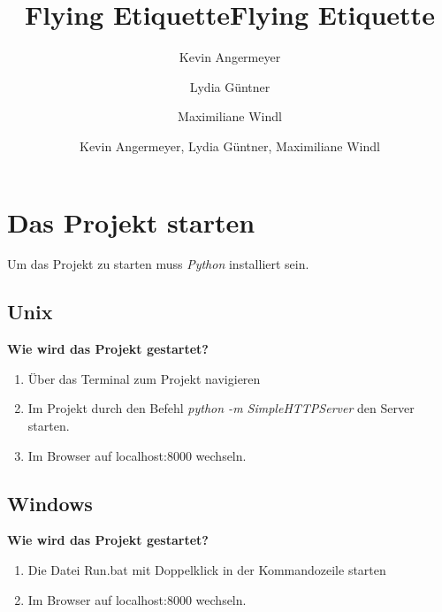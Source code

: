 \documentclass{mi-seminar}
\title{Flying Etiquette}
\author{Kevin Angermeyer \\ \and Lydia Güntner \\ \and Maximiliane Windl}
\title{Flying Etiquette}
\author{Kevin Angermeyer, Lydia Güntner, Maximiliane Windl}
\begin{document}
\maketitle
\vspace*{2.5cm}
\section{Das Projekt starten} \label{Das Projekt starten}
Um das Projekt zu starten muss \textit{Python} installiert sein.
\subsection{Unix}
\textbf{Wie wird das Projekt gestartet?}\newline
\begin{enumerate}
\item Über das Terminal zum Projekt navigieren
\item Im Projekt durch den Befehl \textit{python -m SimpleHTTPServer} den Server starten.\newline
\item Im Browser auf localhost:8000 wechseln.
\end{enumerate}
\subsection{Windows}
\textbf{Wie wird das Projekt gestartet?}\newline
\begin{enumerate}
\item Die Datei Run.bat mit Doppelklick in der Kommandozeile starten 
\item Im Browser auf localhost:8000 wechseln.
\end{enumerate}
\end{document}
